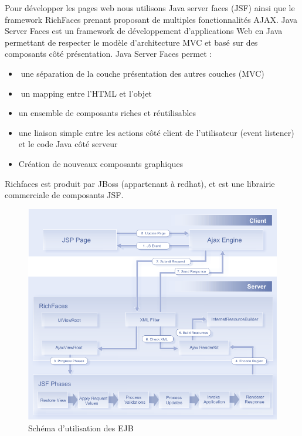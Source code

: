 Pour développer les pages web nous utilisons Java server faces (JSF) ainsi que le framework RichFaces prenant proposant de multiples fonctionnalités AJAX.  Java Server Faces est un framework de développement d’applications Web en Java permettant de respecter le modèle d’architecture MVC et basé sur des composants côté présentation.  Java Server Faces permet :\\
\begin{itemize}
\item une séparation de la couche présentation des autres couches (MVC)
\item un mapping entre l’HTML et l’objet
\item un ensemble de composants riches et réutilisables
\item une liaison simple entre les actions côté client de l’utilisateur (event listener) et le code Java côté serveur
\item Création de nouveaux composants graphiques
\end{itemize}
Richfaces est produit par JBoss (appartenant à redhat), et est une librairie commerciale de composants JSF.
\begin{figure}[position]
   \caption{Schéma d'utilisation des EJB}
   \includegraphics[scale=1]{a4jsfPhases.png} 
\end{figure}

